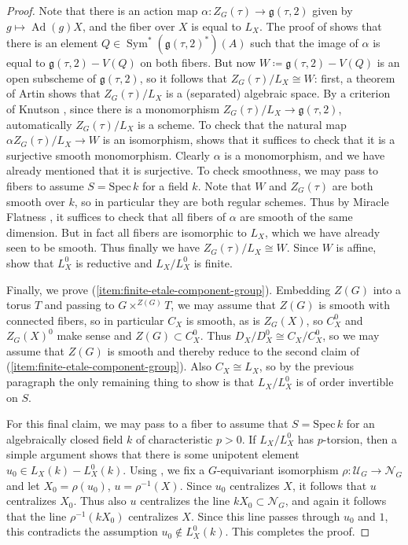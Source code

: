 \documentclass[11pt,reqno]{amsart}
\theoremstyle{definition}
\newcommand{\Spec}{\mathrm{Spec} \,}
\newcommand{\sN}{{\mathscr N}}
\newcommand{\sU}{{\mathscr U}}
\newcommand{\fg}{\mathfrak{g}}
\DeclareMathOperator{\Ad}{Ad}
\DeclareMathOperator{\Sym}{Sym}
\begin{document}
\begin{proof}
Note that there is an action map $\alpha: Z_G(\tau) \to \fg(\tau, 2)$ given by $g \mapsto \Ad(g)X$, and the fiber over $X$ is equal to $L_X$. The proof of \cite[Thm.\ 2.3]{Premet} shows that there is an element $Q \in \Sym^*(\fg(\tau, 2)^*)(A)$ such that the image of $\alpha$ is equal to $\fg(\tau, 2) - V(Q)$ on both fibers. But now $W \coloneqq \fg(\tau, 2) - V(Q)$ is an open subscheme of $\fg(\tau, 2)$, so it follows that $Z_G(\tau)/L_X \cong W$: first, a theorem of Artin \cite[Cor.\ 6.4]{Artin-stacks} shows that $Z_G(\tau)/L_X$ is a (separated) algebraic space. By a criterion of Knutson \cite[II, Thm.\ 6.15]{Knutson-algebraic-spaces}, since there is a monomorphism $Z_G(\tau)/L_X \to \fg(\tau, 2)$, automatically $Z_G(\tau)/L_X$ is a scheme. To check that the natural map $\alpha Z_G(\tau)/L_X \to W$ is an isomorphism, \cite[IV\textsubscript{4}, Thm.\ 17.9.1]{EGA} shows that it suffices to check that it is a surjective smooth monomorphism. Clearly $\alpha$ is a monomorphism, and we have already mentioned that it is surjective. To check smoothness, we may pass to fibers to assume $S = \Spec k$ for a field $k$. Note that $W$ and $Z_G(\tau)$ are both smooth over $k$, so in particular they are both regular schemes. Thus by Miracle Flatness \cite[Thm.\ 23.1]{Matsumura}, it suffices to check that all fibers of $\alpha$ are smooth of the same dimension. But in fact all fibers are isomorphic to $L_X$, which we have already seen to be smooth. Thus finally we have $Z_G(\tau)/L_X \cong W$. Since $W$ is affine, \cite[Thms.\ 9.4.1 and 9.7.6]{Alper-adequate} show that $L_X^0$ is reductive and $L_X/L_X^0$ is finite. \smallskip

Finally, we prove (\ref{item:finite-etale-component-group}). Embedding $Z(G)$ into a torus $T$ and passing to $G \times^{Z(G)} T$, we may assume that $Z(G)$ is smooth with connected fibers, so in particular $C_X$ is smooth, as is $Z_G(X)$, so $C_X^0$ and $Z_G(X)^0$ make sense and $Z(G) \subset C_X^0$. Thus $D_X/D_X^0 \cong C_X/C_X^0$, so we may assume that $Z(G)$ is smooth and thereby reduce to the second claim of (\ref{item:finite-etale-component-group}). Also $C_X \cong L_X$, so by the previous paragraph the only remaining thing to show is that $L_X/L_X^0$ is of order invertible on $S$. \smallskip

For this final claim, we may pass to a fiber to assume that $S = \Spec k$ for an algebraically closed field $k$ of characteristic $p > 0$. If $L_X/L_X^0$ has $p$-torsion, then a simple argument shows that there is some unipotent element $u_0 \in L_X(k) - L_X^0(k)$. Using \cite[Thm.\ 5.1]{Integral-Springer}, we fix a $G$-equivariant isomorphism $\rho: \sU_G \to \sN_G$ and let $X_0 = \rho(u_0)$, $u = \rho^{-1}(X)$. Since $u_0$ centralizes $X$, it follows that $u$ centralizes $X_0$. Thus also $u$ centralizes the line $kX_0 \subset \sN_G$, and again it follows that the line $\rho^{-1}(kX_0)$ centralizes $X$. Since this line passes through $u_0$ and $1$, this contradicts the assumption $u_0 \not\in L_X^0(k)$. This completes the proof.
\end{proof}
\end{document}
